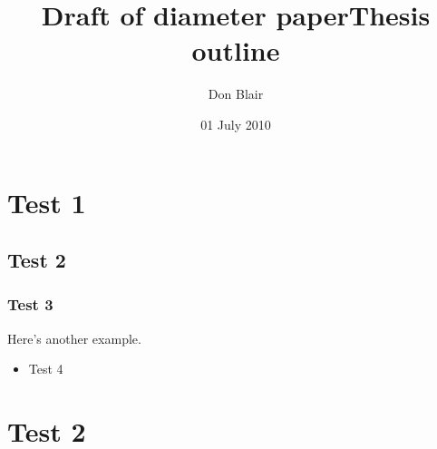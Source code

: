 \documentclass{article}
\title{Draft of diameter paper}
\date{01 July 2010}
\begin{document}
\title{Thesis outline}
\author{Don Blair}
\maketitle{}
\tableofcontents
\pagebreak

\section{Test 1}
\label{sec-1}
\subsection{Test 2}
\label{sec-1.1}
\subsubsection{Test 3}
\label{sec-1.1.1}

Here's another example. \cite{Deng2009a}
\begin{itemize}

\item Test 4\\
\label{sec-1.1.1.1}%
\end{itemize} %
\section{Test 2}
\label{sec-2}

\cite{OsSo04}





\end{document}
